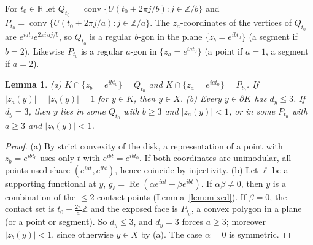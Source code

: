 \documentclass[11pt]{amsart}
\newtheorem{lemma}[theorem]{Lemma}
\theoremstyle{remark}
\newcommand{\R}{\mathbb{R}}
\newcommand{\Z}{\mathbb{Z}}
\newcommand{\conv}{\operatorname{conv}}
\newcommand{\re}{\operatorname{Re}}
\begin{document}
For $t_0\in\R$ let $Q_{t_0}=\conv\{U(t_0+2\pi j/b): j\in\Z/b\}$ and $P_{t_0}=\conv\{U(t_0+2\pi j/a): j\in\Z/a\}$.
The $z_a$-coordinates of the vertices of $Q_{t_0}$ are $e^{iat_0}e^{2\pi i\,aj/b}$, so $Q_{t_0}$ is a regular $b$-gon in the plane $\{z_b=e^{ibt_0}\}$ (a segment if $b=2$).
Likewise $P_{t_0}$ is a regular $a$-gon in $\{z_a=e^{iat_0}\}$ (a point if $a=1$, a segment if $a=2$).

\begin{lemma}\label{lem:facesB}
(a) $K\cap\{z_b=e^{ibt_0}\}=Q_{t_0}$ and $K\cap\{z_a=e^{iat_0}\}=P_{t_0}$. If $|z_a(y)|=|z_b(y)|=1$ for $y\in K$, then $y\in X$.
(b) Every $y\in\partial K$ has $d_y\le3$. If $d_y=3$, then $y$ lies in some $Q_{t_0}$ with $b\ge3$ and $|z_a(y)|<1$, or in some $P_{t_0}$ with $a\ge3$ and $|z_b(y)|<1$.
\end{lemma}
\begin{proof}
(a) By strict convexity of the disk, a representation of a point with $z_b=e^{ibt_0}$ uses only $t$ with $e^{ibt}=e^{ibt_0}$. If both coordinates
are unimodular, all points used share $(e^{iat},e^{ibt})$, hence coincide by injectivity.
(b) Let $\ell$ be a supporting functional at $y$, $g_\ell=\re(\alpha e^{iat}+\beta e^{ibt})$. If $\alpha\beta\ne0$, then $y$ is a combination of the $\le2$ contact points
(Lemma~\ref{lem:mixed}). If $\beta=0$, the contact set is $t_0+\frac{2\pi}a\Z$ and the exposed face is $P_{t_0}$, a convex polygon in a plane (or a point or segment).
So $d_y\le3$, and $d_y=3$ forces $a\ge3$; moreover $|z_b(y)|<1$, since otherwise $y\in X$ by (a). The case $\alpha=0$ is symmetric.
\end{proof}
\end{document}
